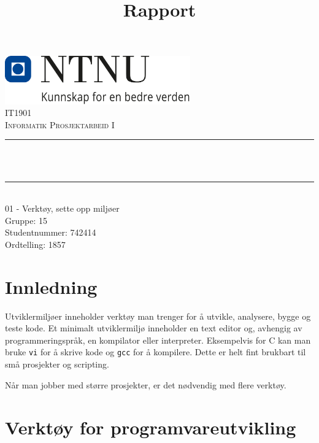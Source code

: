 \documentclass[12pt,a4paper]{article}
\title{Rapport}
\def \fagkode{IT1901}
\def \fagtittel{Informatik Prosjektarbeid I}
\def \studentnummer{742414}
\def \gruppenummer{15}
\def \ordtelling{1857}
\def \tema{01 - Verktøy, sette opp miljøer}
\begin{document}
\makeatletter
\begin{titlepage}
    \begin{center}
    \includegraphics[width=0.60\textwidth]{NTNU_logo.png}\\[1cm]
    \textsc{\Large \fagkode}\\[0.5cm]
    \textsc{\large \fagtittel}\\[0.5cm]

    \rule{\linewidth}{0.5mm} \\[0.4cm]
    { \huge \bfseries \@title \\[0.4cm] }
    \rule{\linewidth}{0.5mm} \\[1.5cm]

    \LARGE
    \tema\\[1cm]

    \large
    Gruppe: \gruppenummer\\[0.25cm]

    \large
    Studentnummer: \studentnummer\\[0.25cm]

    \large
    Ordtelling: \ordtelling

    \vfill

    \large
    \@date
    \end{center}
\end{titlepage}
\makeatother

\newpage

\section*{Innledning}

Utviklermiljøer inneholder verktøy man trenger for å utvikle, analysere,
bygge og teste kode. Et minimalt utviklermiljø inneholder en text editor
og, avhengig av programmeringspråk, en kompilator eller interpreter.
Eksempelvis for C kan man bruke \texttt{vi} for å skrive kode og
\texttt{gcc} for å kompilere. Dette er helt fint brukbart til små
prosjekter og scripting.

Når man jobber med større prosjekter, er det nødvendig med flere
verktøy.

\section*{Verktøy for programvareutvikling}
\end{document}
